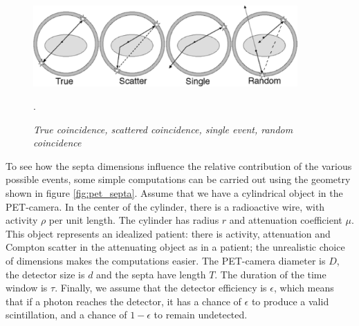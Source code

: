 \begin{figure}[tb]
\centering
\includegraphics[width=0.9\textwidth]{figs/fig_pet_random_enzo.pdf}
\caption{\label{fig:pet_random_enzo} \emph{True coincidence, scattered
coincidence, single event, random coincidence}}.
\end{figure}

To see how the septa dimensions influence the relative contribution of the
various possible events, some simple computations can be carried out using the
geometry shown in figure \ref{fig:pet_septa}. Assume that we have a
cylindrical object in the PET-camera. In the center of the cylinder, there is
a radioactive wire, with activity $\rho$ per unit length. The cylinder has
radius $r$ and attenuation coefficient $\mu$. This object represents an
idealized patient: there is activity, attenuation and Compton scatter in the
attenuating object as in a patient; the unrealistic choice of dimensions makes
the computations easier. The PET-camera diameter is $D$, the detector size is
$d$ and the septa have length $T$. The duration of the time window is
$\tau$. Finally, we assume that the detector efficiency is $\epsilon$, which
means that if a photon reaches the detector, it has a chance of $\epsilon$ to
produce a valid scintillation, and a chance of $1 - \epsilon$ to remain
undetected.\\[2mm]

